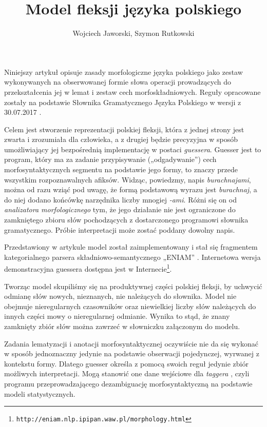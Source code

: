 \documentclass{article}
\title{Model fleksji języka polskiego}
\author{Wojciech Jaworski, Szymon Rutkowski}
\date{}
\begin{document}
\maketitle

Niniejszy artykuł opisuje zasady morfologiczne języka polskiego
jako zestaw wykonywanych na obserwowanej formie słowa operacji
prowadzących do przekształcenia jej w lemat i zestaw cech morfoskładniowych.
Reguły opracowane zostały na podstawie Słownika Gramatycznego Języka Polskiego 
w wersji z 30.07.2017 \cite{SGJP}.

Celem jest stworzenie reprezentacji polskiej fleksji, która
z jednej strony jest zwarta i zrozumiała dla człowieka, 
a z drugiej będzie precyzyjna w sposób umożliwiający jej bezpośrednią implementację
w postaci {\it guessera}. 
Guesser jest to program, który ma za zadanie przypisywanie („odgadywanie”) 
cech morfosyntaktycznych segmentu na podstawie jego formy, to znaczy przede wszystkim rozpoznawalnych afiksów. 
Widząc, powiedzmy, napis \textit{burachnajami}, można od razu wziąć pod uwagę, 
że formą podstawową wyrazu jest \textit{burachnaj}, a do niej dodano końcówkę narzędnika liczby mnogiej \textit{-ami}.
Różni się on od {\it analizatora morfologicznego} \cite{Morfeusz} tym, że jego działanie nie jest ograniczone do 
zamkniętego zbioru słów pochodzących z dostarczonego programowi słownika gramatycznego.
Próbie interpretacji może zostać poddany dowolny napis.

Przedstawiony w artykule model został zaimplementowany i 
stał się fragmentem kategorialnego parsera składniowo-semantycznego „ENIAM” \cite{ENIAM}.
Internetowa wersja demonstracyjna guessera dostępna jest w Internecie\footnote{ {\tt http://eniam.nlp.ipipan.waw.pl/morphology.html}}.

Tworząc model skupiliśmy się na produktywnej części polskiej fleksji,
by uchwycić odmianę słów nowych, nieznanych, nie należących do słownika.
Model nie obejmuje nieregularnych czasowników oraz niewielkiej liczby słów 
należących do innych części mowy o nieregularnej odmianie.
Wynika to stąd, że znany zamknięty zbiór słów można 
zawrzeć w słowniczku załączonym do modelu. 

Zadania lematyzacji i anotacji morfosyntaktycznej oczywiście 
nie da się wykonać w sposób jednoznaczny jedynie na podstawie 
obserwacji pojedynczej, wyrwanej z kontekstu formy.
Dlatego guesser określa z pomocą swoich reguł jedynie zbiór możliwych interpretacji.
Mogą stanowić one dane wejściowe dla {\it taggera} \cite{Concraft}, czyli programu
przeprowadzającego dezambiguację morfosyntaktyczną na podstawie modeli statystycznych.
\end{document}
